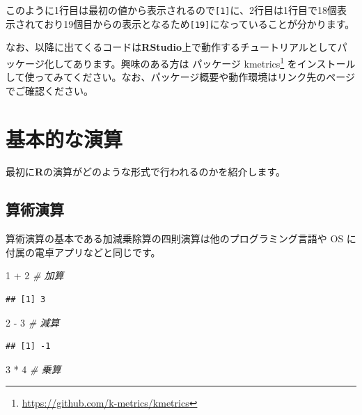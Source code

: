 \documentclass[
  12pt,
]{book}
\newenvironment{Shaded}{\begin{snugshade}}{\end{snugshade}}
\newcommand{\CommentTok}[1]{\textcolor[rgb]{0.56,0.35,0.01}{\textit{#1}}}
\newcommand{\DecValTok}[1]{\textcolor[rgb]{0.00,0.00,0.81}{#1}}
\newcommand{\SpecialCharTok}[1]{\textcolor[rgb]{0.00,0.00,0.00}{#1}}
\DeclareRobustCommand{\href}[2]{#2\footnote{\url{#1}}}
\begin{document}
このように1行目は最初の値から表示されるので\texttt{{[}1{]}}に、2行目は1行目で18個表示されており19個目からの表示となるため\texttt{{[}19{]}}になっていることが分かります。

なお、以降に出てくるコードは\textbf{RStudio}上で動作するチュートリアルとしてパッケージ化してあります。興味のある方は \href{https://github.com/k-metrics/kmetrics}{パッケージ kmetrics} をインストールして使ってみてください。なお、パッケージ概要や動作環境はリンク先のページでご確認ください。

\hypertarget{ux57faux672cux7684ux306aux6f14ux7b97}{%
\section{基本的な演算}\label{ux57faux672cux7684ux306aux6f14ux7b97}}

最初に\textbf{R}の演算がどのような形式で行われるのかを紹介します。

\hypertarget{ux7b97ux8853ux6f14ux7b97}{%
\subsection{算術演算}\label{ux7b97ux8853ux6f14ux7b97}}

算術演算の基本である加減乗除算の四則演算は他のプログラミング言語や OS に付属の電卓アプリなどと同じです。

\begin{Shaded}
\begin{Highlighting}[numbers=left,,]
\DecValTok{1} \SpecialCharTok{+} \DecValTok{2}     \CommentTok{\# 加算}
\end{Highlighting}
\end{Shaded}

\begin{verbatim}
## [1] 3
\end{verbatim}

\begin{Shaded}
\begin{Highlighting}[numbers=left,,]
\DecValTok{2} \SpecialCharTok{{-}} \DecValTok{3}     \CommentTok{\# 減算}
\end{Highlighting}
\end{Shaded}

\begin{verbatim}
## [1] -1
\end{verbatim}

\begin{Shaded}
\begin{Highlighting}[numbers=left,,]
\DecValTok{3} \SpecialCharTok{*} \DecValTok{4}     \CommentTok{\# 乗算}
\end{Highlighting}
\end{Shaded}
\end{document}
